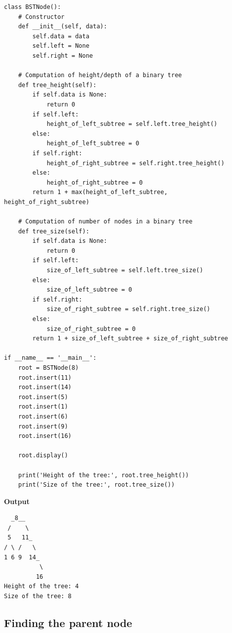 \documentclass[a4paper,11pt]{book}
\begin{document}
\begin{lstlisting}
class BSTNode():
    # Constructor
    def __init__(self, data):
        self.data = data
        self.left = None
        self.right = None
        
    # Computation of height/depth of a binary tree
    def tree_height(self):
        if self.data is None:
            return 0
        if self.left:
            height_of_left_subtree = self.left.tree_height()
        else:
            height_of_left_subtree = 0
        if self.right:
            height_of_right_subtree = self.right.tree_height()
        else:
            height_of_right_subtree = 0
        return 1 + max(height_of_left_subtree, height_of_right_subtree)

    # Computation of number of nodes in a binary tree
    def tree_size(self):
        if self.data is None:
            return 0
        if self.left:
            size_of_left_subtree = self.left.tree_size()
        else:
            size_of_left_subtree = 0
        if self.right:
            size_of_right_subtree = self.right.tree_size()
        else:
            size_of_right_subtree = 0
        return 1 + size_of_left_subtree + size_of_right_subtree
        
if __name__ == '__main__':
    root = BSTNode(8)
    root.insert(11)
    root.insert(14)
    root.insert(5)
    root.insert(1)
    root.insert(6)
    root.insert(9)
    root.insert(16)

    root.display()
    
    print('Height of the tree:', root.tree_height())
    print('Size of the tree:', root.tree_size())
\end{lstlisting}
\textbf{Output}
\begin{lstlisting}
  _8__     
 /    \    
 5   11_   
/ \ /   \  
1 6 9  14_ 
          \
         16
Height of the tree: 4
Size of the tree: 8
\end{lstlisting}

\subsection{Finding the parent node}
\end{document}

